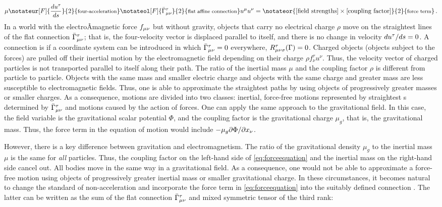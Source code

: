 \documentclass[submitted]{article}
\newcommand{\texts}[1]{\text{\footnotesize{#1}}}
\newcommand{\faraday}{\ensuremath{f}}
\newcommand{\christoffelmnt}{\christoffel{\mu}{\nu}{\tau}}
\newcommand{\Gtmnbar}{\ensuremath{\bar{\Gamma}\tmn}\xspace}
\begin{document}
\begin{equation}
\label{eq:forceequation} 
\mu \notateur[F]{\frac{du^\tau}{\dap}}{2}{\texts{four-acceleration}} \notateol[F]{\Gtmnbar}{2}{\texts{flat affine connection}} u^\mu u^\nu = \notateor{\text{[field strengths]} \times \text{[coupling factor]}}{2}{\texts{force term}} \,.
\end{equation}
In a world with the electroÂ­magnetic force $\faraday\mn$ but without gravity, objects that carry no electrical charge $\rho$ move on the straightest lines of the flat connection $\Gtmnbar$; that is, the four-velocity vector is displaced parallel to itself, and there is no change in velocity ${du^\tau}/{ds}=0$. A connection is  if a coordinate system can be introduced in which $\Gtmnbar=0$ everywhere, \ie $R_{\mu \nu \sigma}^{\tau}(\Gamma)=0$. Charged objects (objects subject to the forces) are pulled off their inertial motion by the electromagnetic field depending on their charge $\rho f^\tau_\nu u^\nu$. Thus, the velocity vector of charged particles is not transported parallel to itself along their path. The ratio of the inertial mass $\mu$ and the coupling factor $\rho$ is different from particle to particle. Objects with the same mass and smaller electric charge and objects with the same charge and greater mass are less susceptible to electromagnetic fields. Thus, one is able to approximate the straightest paths by using objects of progressively greater masses or smaller charges. As a consequence, motions are divided into two classes: inertial, force-free motions represented by straightest \wl{}s determined by $\Gtmnbar$ and motions caused by the action of forces. One can apply the same approach to the gravitational field. In this case, the field variable is the gravitational scalar potential $\Phi$, and the coupling factor is the gravitational charge $\mu_g$, that is, the gravitational mass. Thus, the force term in the equation of motion would include $-\mu_g {\partial \Phi}/{\partial x_\nu}$. 


However, there is a key difference between gravitation and electromagnetism. The ratio of the gravitational  density $\mu_g$ to the inertial mass $\mu$ is the same for \emph{all} particles. Thus, the coupling factor on the left-hand side of \cref{eq:forceequation} and the inertial mass on the right-hand side cancel out. All bodies move in the same way in a gravitational field. As a consequence, one would not be able to approximate a force-free motion using objects of progressively greater inertial mass or smaller gravitational charge. In these circumstances, it becomes natural to change the standard of non-acceleration and incorporate the force term in \cref{eq:forceequation} into the suitably defined connection \Gtmn. The latter can be written as the sum of the flat connection \Gtmnbar and mixed symmetric tensor of the third rank: 
\end{document}
